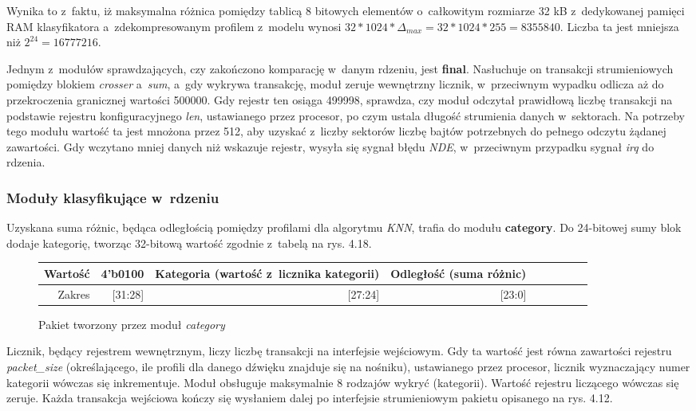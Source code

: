 Wynika to z~faktu, iż maksymalna różnica pomiędzy tablicą 8 bitowych elementów o~całkowitym rozmiarze 32 kB z~dedykowanej pamięci RAM klasyfikatora a~zdekompresowanym profilem z~modelu wynosi $32 * 1024 * \Delta_{max} = 32 * 1024 * 255 = 8 355 840$. Liczba ta jest mniejsza niż $2^{24} = 16 777 216$.

Jednym z~modułów sprawdzających, czy zakończono komparację w~danym rdzeniu, jest \textbf{final}. Nasłuchuje on transakcji strumieniowych pomiędzy blokiem \textit{crosser} a~\textit{sum}, a~gdy wykrywa transakcję, moduł zeruje wewnętrzny licznik, w~przeciwnym wypadku odlicza aż do przekroczenia granicznej wartości 500000. Gdy rejestr ten osiąga 499998, sprawdza, czy moduł odczytał prawidłową liczbę transakcji na podstawie rejestru konfiguracyjnego \textit{len}, ustawianego przez procesor, po czym ustala długość strumienia danych w~sektorach. Na potrzeby tego modułu wartość ta jest mnożona przez 512, aby uzyskać z~liczby sektorów liczbę bajtów potrzebnych do pełnego odczytu żądanej zawartości. Gdy wczytano mniej danych niż wskazuje rejestr, wysyła się sygnał błędu \textit{NDE}, w~przeciwnym przypadku sygnał \textit{irq} do rdzenia.

\subsubsection{Moduły klasyfikujące w~rdzeniu}

Uzyskana suma różnic, będąca odległością pomiędzy profilami dla algorytmu \textit{KNN}, trafia do modułu \textbf{category}. Do 24-bitowej sumy blok dodaje kategorię, tworząc 32-bitową wartość zgodnie z~tabelą na rys. 4.18.

\begin{figure}[h]
	\centering
	\begin{tabular}{|r|r|r|r|r|r|r|r|r|}
		\hline
		Wartość & 4'b0100 & Kategoria (wartość z~licznika kategorii) & Odległość (suma różnic)\\
		\hline
		Zakres & [31:28] & [27:24] & [23:0] \\
		\hline
	\end{tabular}
	
	\caption{Pakiet tworzony przez moduł \textit{category}}
\end{figure}

Licznik, będący rejestrem wewnętrznym, liczy liczbę transakcji na interfejsie wejściowym. Gdy ta wartość jest równa zawartości rejestru \textit{packet\_size} (określającego, ile profili dla danego dźwięku znajduje się na nośniku), ustawianego przez procesor, licznik wyznaczający numer kategorii wówczas się inkrementuje. Moduł obsługuje maksymalnie 8 rodzajów wykryć (kategorii). Wartość rejestru liczącego wówczas się zeruje. Każda transakcja wejściowa kończy się wysłaniem dalej po interfejsie strumieniowym pakietu opisanego na rys. 4.12.

